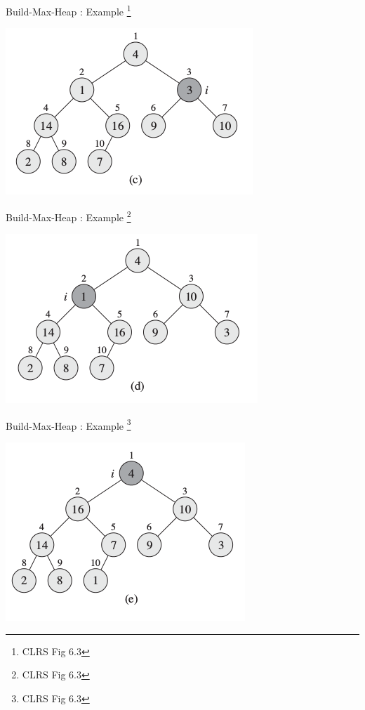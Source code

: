\documentclass{beamer}
\begin{document}
\begin{frame}{Build-Max-Heap : Example \footnote{CLRS Fig 6.3}}
    \begin{center}
        \includegraphics[scale=0.5]{buildMaxHeap3.png}
    \end{center}
\end{frame}


\begin{frame}{Build-Max-Heap : Example \footnote{CLRS Fig 6.3}}
    \begin{center}
        \includegraphics[scale=0.5]{buildMaxHeap4.png}
    \end{center}
\end{frame}


\begin{frame}{Build-Max-Heap : Example \footnote{CLRS Fig 6.3}}
    \begin{center}
        \includegraphics[scale=0.5]{buildMaxHeap5.png}
    \end{center}
\end{frame}
\end{document}
